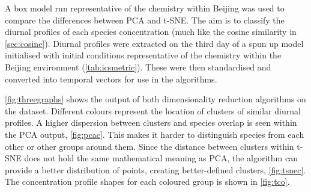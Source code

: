 A box model run representative of the chemistry within Beijing was used to compare the differences between PCA and t-SNE. The aim is to classify the diurnal profiles of each species concentration (much like the cosine similarity in \autoref{sec:cosine}).
Diurnal profiles were extracted on the third day of a spun up model initialised with initial conditions representative of the chemistry within the Beijing environment (\autoref{tab:icsmetric}).
These were then standardised and converted into temporal vectors for use in the algorithms.

\autoref{fig:threegraphs} shows the output of both dimensionality reduction algorithms on the dataset. Different colours represent the location of clusters of similar diurnal profiles. A higher dispersion between clusters and species overlap is seen within the PCA output, \autoref{fig:pcac}. This makes it harder to distinguish species from each other or other groups around them.
Since the distance between clusters within t-SNE does not hold the same mathematical meaning as PCA, the algorithm can provide a better distribution of points, creating better-defined clusters, \autoref{fig:tsnec}. The concentration profile shapes for each coloured group is shown in \autoref{fig:tco}.


